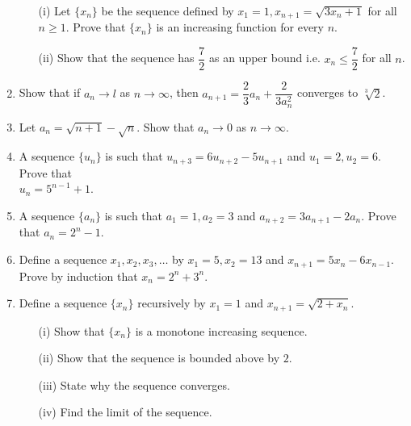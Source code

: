 \documentclass[titlepage,a4paper,12pt]{report}
\begin{document}
\begin{enumerate}
 \begin{itemize}
 \item[(i)] Let $\{x_n\}$ be the sequence defined by $x_1=1, x_{n+1}=\sqrt{3x_n+1}$ for all $n\geq 1$. Prove that $\{x_n\}$ is an increasing function for every $n$.
 \item[(ii)] Show that the sequence has $\dfrac{7}{2}$ as an upper bound i.e. $x_n \leq \dfrac{7}{2}$ for all $n$.
 \end{itemize}
 \item Show that if $a_n\rightarrow l$ as $n\rightarrow \infty$, then $a_{n+1}=\dfrac{2}{3}a_n +\dfrac{2}{3a_n ^2}$ converges to $\sqrt[3]{2}$.
 \item Let $a_n=\sqrt{n+1}-\sqrt{n}$. Show that $a_n\rightarrow 0$ as $n\rightarrow \infty$.
 \item A sequence $\{u_n\}$ is such that $u_{n+3}=6u_{n+2}-5u_{n+1}$ and $u_1=2, u_2=6$. Prove that\\ $u_n=5^{n-1}+1$.
 \item A sequence $\{a_n\}$ is such that $a_1=1, a_2=3$ and $a_{n+2}=3a_{n+1}-2a_n$. Prove that $a_n=2^n-1$.
 \item Define a sequence $x_1, x_2, x_3, \dots$ by $x_1=5, x_2=13$ and $x_{n+1}=5x_n-6x_{n-1}$. Prove by induction that $x_n=2^n+3^n$.
 \item Define a sequence $\{x_n\}$ recursively by $x_1=1$ and $x_{n+1}=\sqrt{2+x_n}$.
 \begin{itemize}
 \item[(i)] Show that $\{x_n\}$ is a monotone increasing sequence.
 \item[(ii)] Show that the sequence is bounded above by $2$.
 \item[(iii)] State why the sequence converges.
 \item[(iv)] Find the limit of the sequence.
 \end{itemize}
\end{enumerate}
\end{document}
